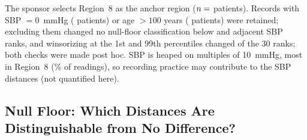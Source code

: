\documentclass[AMA,Times1COL]{WileyNJDv5}
\begin{document}
The sponsor selects Region~8 as the anchor region ($n = \numval{nR8}$ patients). Records with SBP $= 0$~mmHg ( patients) or age $> 100$ years ( patients) were retained; excluding them changed no null-floor classification below and  adjacent SBP ranks, and winsorizing at the 1st and 99th percentiles changed  of the 30 ranks; both checks were made post hoc. SBP is heaped on multiples of 10~mmHg, most in Region~8 (\% of readings), so recording practice may contribute to the SBP distances (not quantified here).


\subsection{Null Floor: Which Distances Are Distinguishable from No Difference?}\label{sec:app_operability}
\end{document}
